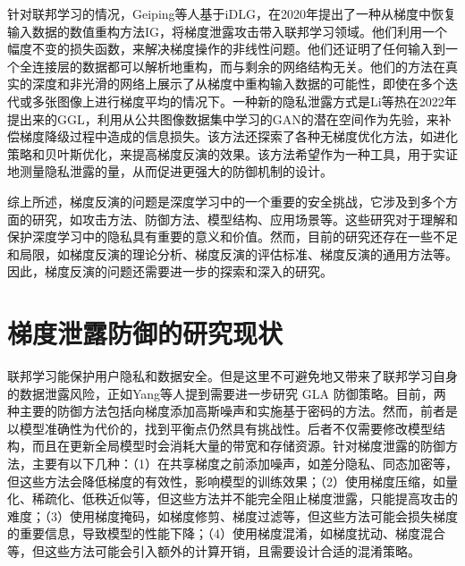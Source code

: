 针对联邦学习的情况，Geiping等人\cite{Inverting_Gradients}基于iDLG，在2020年提出了一种从梯度中恢复输入数据的数值重构方法IG，将梯度泄露攻击带入联邦学习领域。他们利用一个幅度不变的损失函数，来解决梯度操作的非线性问题。他们还证明了任何输入到一个全连接层的数据都可以解析地重构，而与剩余的网络结构无关。他们的方法在真实的深度和非光滑的网络上展示了从梯度中重构输入数据的可能性，即使在多个迭代或多张图像上进行梯度平均的情况下。一种新的隐私泄露方式是Li等热\cite{GGL}在2022年提出来的GGL，利用从公共图像数据集中学习的GAN的潜在空间作为先验，来补偿梯度降级过程中造成的信息损失。该方法还探索了各种无梯度优化方法，如进化策略和贝叶斯优化，来提高梯度反演的效果。该方法希望作为一种工具，用于实证地测量隐私泄露的量，从而促进更强大的防御机制的设计。

综上所述，梯度反演的问题是深度学习中的一个重要的安全挑战，它涉及到多个方面的研究，如攻击方法、防御方法、模型结构、应用场景等。这些研究对于理解和保护深度学习中的隐私具有重要的意义和价值。然而，目前的研究还存在一些不足和局限，如梯度反演的理论分析、梯度反演的评估标准、梯度反演的通用方法等。因此，梯度反演的问题还需要进一步的探索和深入的研究。

\section{梯度泄露防御的研究现状}

联邦学习能保护用户隐私和数据安全。但是这里不可避免地又带来了联邦学习自身的数据泄露风险，正如Yang等人\cite{Gradient_Leakage_Attacks_in_Federated_Learning}提到需要进一步研究 GLA 防御策略。目前，两种主要的防御方法包括向梯度添加高斯噪声和实施基于密码的方法。然而，前者是以模型准确性为代价的，找到平衡点仍然具有挑战性。后者不仅需要修改模型结构，而且在更新全局模型时会消耗大量的带宽和存储资源。针对梯度泄露的防御方法，主要有以下几种：（1）在共享梯度之前添加噪声，如差分隐私、同态加密等，但这些方法\cite{Efficient_Privacy-Preserving_Federated_Learning_Against_Inference_Attacks_for_IoT,Mixed_Quantization_Enabled_Federated_Learning_To_Tackle_Gradient_Inversion_Attacks,Revealing_and_Protecting_Labels_in_Distributed_Training,FedML-HE_An_Efficient_Homomorphic-Encryption-Based_Privacy-Preserving_Federated_Learning_System,Distributed_Learning_in_Trusted_Execution_Environment_A_Case_Study_of_Federated_Learning_in_SGX}会降低梯度的有效性，影响模型的训练效果；（2）使用梯度压缩，如量化、稀疏化、低秩近似等，但这些方法并不能完全阻止梯度泄露，只能提高攻击的难度；（3）使用梯度掩码，如梯度修剪、梯度过滤等，但这些方法可能会损失梯度的重要信息，导致模型的性能下降；（4）使用梯度混淆，如梯度扰动、梯度混合等，但这些方法可能会引入额外的计算开销，且需要设计合适的混淆策略。

